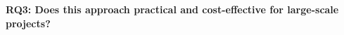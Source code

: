 \documentclass[conference]{IEEEtran}
\begin{document}

\noindent \textbf{RQ3: Does this approach practical and cost-effective for large-scale projects?}\\



%
%
%
%
%
%
%
%
%
\end{document}
